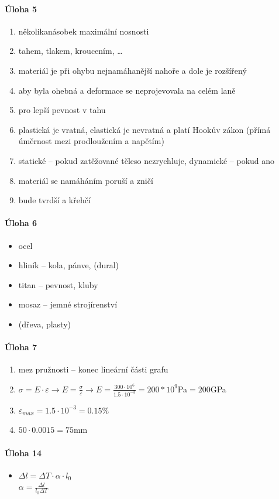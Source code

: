 \paragraph{Úloha 5}
\begin{enumerate}
\item několikanásobek maximální nosnosti
\item tahem, tlakem, kroucením, \ldots
\item materiál je při ohybu nejnamáhanější nahoře a dole \ra je rozšířený
\item aby byla ohebná a deformace se neprojevovala na celém laně
\item pro lepší pevnost v tahu
\item plastická je vratná, elastická je nevratná a platí Hookův zákon (přímá úměrnost mezi prodloužením a napětím)
\item statické -- pokud zatěžované těleso nezrychluje, dynamické -- pokud ano
\item materiál se namáháním poruší a zničí
\item bude tvrdší a křehčí
\end{enumerate}

\paragraph{Úloha 6}
\begin{itemize}
\item ocel
\item hliník -- kola, pánve, (dural)
\item titan -- pevnost, kluby
\item mosaz -- jemné strojírenství
\item (dřeva, plasty)
\end{itemize}

\paragraph{Úloha 7}
\begin{enumerate}
\item mez pružnosti -- konec lineární části grafu
\item $\sigma = E \cdot \varepsilon \rightarrow E = \frac{\sigma}{\varepsilon} \rightarrow E = \frac{300 \cdot 10^6}{1.5 \cdot 10^{-3}} = 200 * 10^9 $Pa$ = 200$GPa
\item $\varepsilon_{max} = 1.5 \cdot 10^{-3} = 0.15$\%
\item $50 \cdot 0.0015 = 75$mm 
\end{enumerate}

\paragraph{Úloha 14}
\begin{itemize}
\item $\Delta l = \Delta T \cdot \alpha \cdot l_0$ \\ 
$\alpha = \frac{\Delta l}{l_0 \Delta T}$
\end{itemize}



